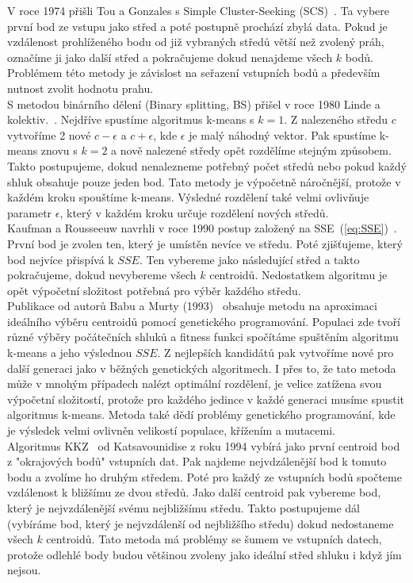 V roce 1974 přišli Tou a Gonzales s Simple Cluster-Seeking (SCS)~\cite{Tou74}. Ta vybere první bod ze vstupu jako střed a poté postupně prochází zbylá data. Pokud je vzdálenost prohlíženého bodu od již vybraných středů větší než zvolený práh, označíme ji jako další střed a pokračujeme dokud nenajdeme všech $k$ bodů. Problémem této metody je závislost na seřazení vstupních bodů a především nutnost zvolit hodnotu prahu.\\

S metodou binárního dělení (Binary splitting, BS) přišel v roce 1980 Linde a kolektiv.~\cite{Linde80}. Nejdříve spustíme algoritmus k-means s $k=1$. Z nalezeného středu $c$ vytvoříme 2 nové $c-\epsilon$ a $c+\epsilon$, kde $\epsilon$ je malý náhodný vektor. Pak spustíme k-means znovu s $k=2$ a nově nalezené středy opět rozdělíme stejným způsobem. Takto postupujeme, dokud nenalezneme potřebný počet středů nebo pokud každý shluk obsahuje pouze jeden bod. Tato metody je výpočetně náročnější, protože v každém kroku spouštíme k-means. Výsledné rozdělení také velmi ovlivňuje parametr $\epsilon$, který v každém kroku určuje rozdělení nových středů.\\

Kaufman a Rousseeuw navrhli v roce 1990 postup založený na SSE~(\autoref{eq:SSE})~\cite{kaufman90}. První bod je zvolen ten, který je umístěn nevíce ve středu. Poté zjišťujeme, který bod nejvíce přispívá k $SSE$. Ten vybereme jako následující střed a takto pokračujeme, dokud nevybereme všech $k$ centroidů. Nedostatkem algoritmu je opět výpočetní složitost potřebná pro výběr každého středu.\\

Publikace od autorů Babu a Murty (1993)~\cite{babu93} obsahuje metodu na aproximaci ideálního výběru centroidů pomocí genetického programování. Populaci zde tvoří různé výběry počátečních shluků a fitness funkci spočítáme spuštěním algoritmu k-means a jeho výslednou $SSE$. Z nejlepších kandidátů pak vytvoříme nové pro další generaci jako v běžných genetických algoritmech. I přes to, že tato metoda může v mnohým případech nalézt optimální rozdělení, je velice zatížena svou výpočetní složitostí, protože pro každého jedince v každé generaci musíme spustit algoritmus k-means. Metoda také dědí problémy genetického programování, kde je výsledek velmi ovlivněn velikostí populace, křížením a mutacemi.\\

Algoritmus KKZ~\cite{katsavounidis94} od Katsavounidise z roku 1994 vybírá jako první centroid bod z "okrajových bodů" vstupních dat. Pak najdeme nejvdzálenější bod k tomuto bodu a zvolíme ho druhým středem. Poté pro každý ze vstupních bodů spočteme vzdálenost k bližšímu ze dvou středů. Jako další centroid pak vybereme bod, který je nejvzdálenější svému nejbližšímu středu. Takto postupujeme dál (vybíráme bod, který je nejvzdálenší od nejbližšího středu) dokud nedostaneme všech $k$ centroidů. Tato metoda má problémy se šumem ve vstupních datech, protože odlehlé body budou většinou zvoleny jako ideální střed shluku i když jím nejsou.\\

